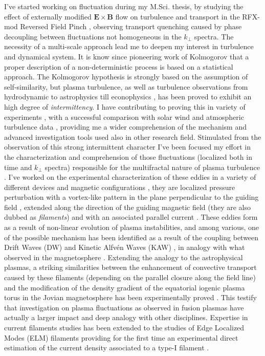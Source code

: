 \documentclass[12pt,a4paper]{article}
\begin{document}
I've started working on fluctuation during my M.Sci. thesis, by
studying the effect of externally modified $\mathbf{E}\times\mathbf{B}$
flow on turbulence and transport in the RFX-mod Reversed Field Pinch
\cite{Antoni:2000p3587}, observing transport quenching caused by
phase decoupling between fluctuations not homogeneous in the
$k_{\perp}$ spectra. The necessity of a multi-scale approach lead me to deepen my
interest in turbulence and dynamical system. It is know since
pioneering work of Kolmogorov \cite{Frisch:1996ue} that a proper
description of a non-deterministic process is based on a statistical
approach.  The Kolmogorov hypothesis is strongly based on the
assumption of self-similarity, but plasma turbulence, as well as turbulence observations from hydrodynamic to
astrophysics till econophysics \cite{Sornette:2006dt}, has been proved
to exhibit an high degree of \emph{intermittency}. I have contributing
to proving this in variety of experiments
\cite{Antoni:2001p662,Vianello:2002p3579}, with a successful comparison 
with solar wind and atmospheric turbulence data
\cite{Carbone:2002p2809}, providing me a wider comprehension of the
mechanism and advanced investigation tools used also in other research
field. Stimulated from the observation of this strong intermittent
character I've been focused my effort in the characterization and
comprehension of those fluctuations (localized both in time and
$k_{\perp}$ spectra) responsible for the multifractal nature of plasma turbulence
\cite{Bohr:1998fn}. I've worked on the experimental characterization
of these eddies in a variety
of different devices and magnetic configurations
\cite{Spolaore:2009p4115,Vianello:2010p4670,Furno:2011cs,Spolaore:2015ij},
they are localized pressure perturbation with a vortex-like pattern in
the plane perpendicular to the guiding field \cite{Antoni:2006p3585},
extended along the direction of the guiding magnetic field (they are also dubbed as \emph{filaments})
and with an associated parallel current
\cite{Spolaore:2009p4115,Vianello:2010p4670}. These eddies form as a
result of non-linear evolution of plasma instabilities, and among
various,  one of the possible mechanism has been identified as a result
of the coupling between Drift Waves (DW) and Kinetic Alfv{\'e}n Waves
(KAW) \cite{Vianello:2010p4670}, in analogy with what observed in the
magnetosphere \cite{Martines:2009p4483,Sundkvist:2005is}. Extending
the analogy to the astrophysical plasmas, a striking similarities
between the enhancement of convective transport caused by these
filaments (depending on the parallel closure along the field line) and
the modification of the density gradient of the equatorial iogenic
plasma torus in the Jovian magnetosphere \cite{Frank:2002eu} has been
experimentally proved \cite{carralero:prl2015}. This testify that investigation on
plasma fluctuations as observed in fusion plasmas have actually a
larger impact and deep analogy with other disciplines. 
Expertise in
current filaments studies has been extended to the studies of Edge
Localized Modes (ELM)
filaments providing for the first time an experimental direct estimation of the
current density associated to a type-I filament
\cite{PhysRevLett.106.125002,Naulin:2011im,Muller:2011kj,Spolaore:2015tk}.
\end{document}
